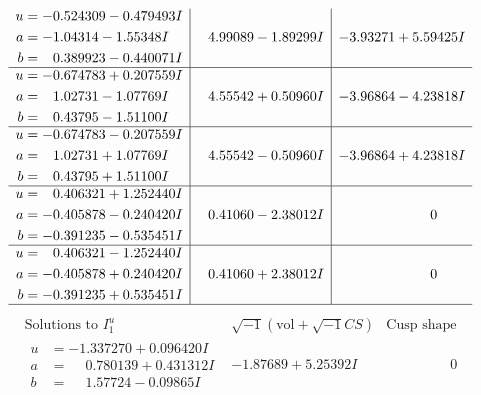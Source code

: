 \documentclass[1p]{elsarticle_modified}
\theoremstyle{definition}
\newcommand{\I}{\sqrt{-1}}
\begin{document}
$$\begin{array}{c|c|c}
\begin{aligned}
u &= -0.524309 - 0.479493 I \\
a &= -1.04314 - 1.55348 I \\
b &= \phantom{-}0.389923 - 0.440071 I\end{aligned}
 & \phantom{-}4.99089 - 1.89299 I & -3.93271 + 5.59425 I \\ \hline\begin{aligned}
u &= -0.674783 + 0.207559 I \\
a &= \phantom{-}1.02731 - 1.07769 I \\
b &= \phantom{-}0.43795 - 1.51100 I\end{aligned}
 & \phantom{-}4.55542 + 0.50960 I & -3.96864 - 4.23818 I \\ \hline\begin{aligned}
u &= -0.674783 - 0.207559 I \\
a &= \phantom{-}1.02731 + 1.07769 I \\
b &= \phantom{-}0.43795 + 1.51100 I\end{aligned}
 & \phantom{-}4.55542 - 0.50960 I & -3.96864 + 4.23818 I \\ \hline\begin{aligned}
u &= \phantom{-}0.406321 + 1.252440 I \\
a &= -0.405878 - 0.240420 I \\
b &= -0.391235 - 0.535451 I\end{aligned}
 & \phantom{-}0.41060 - 2.38012 I & \phantom{-0.000000 } 0 \\ \hline\begin{aligned}
u &= \phantom{-}0.406321 - 1.252440 I \\
a &= -0.405878 + 0.240420 I \\
b &= -0.391235 + 0.535451 I\end{aligned}
 & \phantom{-}0.41060 + 2.38012 I & \phantom{-0.000000 } 0\\
 \hline 
 \end{array}$$\newpage$$\begin{array}{c|c|c}  
\text{Solutions to }I^u_{1}& \I (\text{vol} + \sqrt{-1}CS) & \text{Cusp shape}\\
 \hline 
\begin{aligned}
u &= -1.337270 + 0.096420 I \\
a &= \phantom{-}0.780139 + 0.431312 I \\
b &= \phantom{-}1.57724 - 0.09865 I\end{aligned}
 & -1.87689 + 5.25392 I & \phantom{-0.000000 } 0 \\ \hline\begin{aligned}

\end{aligned}
\end{array}$$
\end{document}
